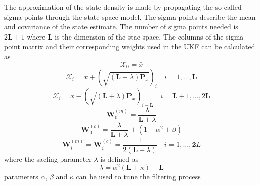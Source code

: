 \documentclass[12pt]{iopart}		%
\begin{document}
The approximation of the state density is made by propagating the so called sigma points through the state-space model. The sigma points describe the mean and covariance of the state estimate. The number of sigma points needed is $2\mathbf L+1$ where $\mathbf L$ is the dimension of the stae space. The  columns of the sigma point matrix and their corresponding weights used in the UKF can be calculated as
\begin{equation}
 \mathcal X_{0}=\bar x
\end{equation}
\begin{equation}
 \mathcal X_{i}=\bar x+(\sqrt{(\mathbf L + \lambda)\mathbf P_x})_i \quad i=1, \dots, \mathbf L
\end{equation}
\begin{equation}
 \mathcal X_{i}=\bar x-(\sqrt{(\mathbf L + \lambda)\mathbf P_x})_{i-\mathbf L} \quad i=\mathbf L+1, \dots, 2\mathbf L
\end{equation}
\begin{equation}
 \mathbf W_0^{(m)}=\frac{\lambda}{\mathbf L+\lambda}
\end{equation}
\begin{equation}
 \mathbf W_0^{(c)}=\frac{\lambda}{\mathbf L+\lambda}+(1-\alpha^2+\beta)
\end{equation}
\begin{equation}
 \mathbf W_i^{(m)}=\mathbf W_i^{(c)}=\frac{1}{2(\mathbf L+\lambda)} \quad i=1, \dots, \mathbf 2L
\end{equation}
where the sacling parameter $\lambda$ is defined as
\begin{equation}
\lambda=\alpha^2(\mathbf L+\kappa)-\mathbf L 
\end{equation}
parameters $\alpha$, $\beta$ and $\kappa$ can be used to tune the filtering process \cite{Haykin2001}

\end{document}

